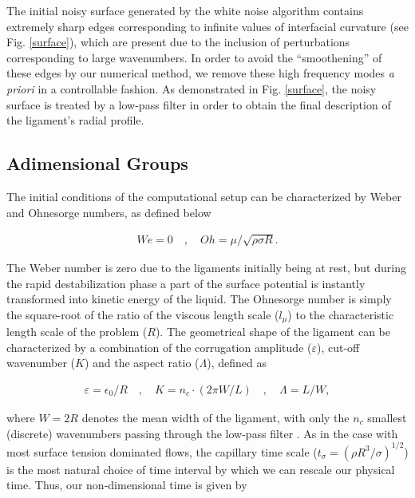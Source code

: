 The initial noisy surface generated by the white noise algorithm
contains extremely sharp edges corresponding to infinite values of 
interfacial curvature (see Fig. \ref{surface}), which are present due
to the inclusion of perturbations corresponding to large wavenumbers. 
In order to avoid the ``smoothening'' of these edges by our numerical method,   
we remove these high frequency modes \textit{a priori} in a controllable fashion. 
As demonstrated in Fig. \ref{surface}, the noisy surface is treated by a low-pass filter 
in order to obtain the final description of the ligament's radial profile. 


\subsection*{Adimensional Groups}

The initial conditions of the computational setup can be 
characterized by Weber and Ohnesorge numbers, as defined below   

\begin{align}
	We = 0 \quad , \quad Oh = \mu / \sqrt{\rho \sigma R} . 
\end{align}

The Weber number is zero due to the ligaments initially being at rest, 
but during the rapid destabilization phase a part of the surface 
potential is instantly transformed into kinetic energy of the liquid.  
The Ohnesorge number is simply the square-root of the ratio  
of the viscous length scale ($l_\mu$)  
to the characteristic length scale of the problem ($R$).
The geometrical shape of the ligament can 
be characterized by a combination of the 
corrugation amplitude ($\varepsilon$),
cut-off wavenumber ($K$) and the aspect ratio ($\Lambda$), defined as   

\begin{align}
 \varepsilon = \epsilon_0 / R \quad , \quad K = n_c \cdot \left(2\pi W/ L \right) \quad
	, \quad \Lambda = L / W , 
\end{align}

where $W = 2R$ denotes the mean width of the ligament, with only
the $n_c$ smallest (discrete) wavenumbers passing through the low-pass filter .
As in the case with most surface tension dominated flows, 
the capillary time scale ($t_\sigma = (\rho R^3 / \sigma)^{1/2}$) is the most 
natural choice of time interval by which we can rescale our physical time.
Thus, our non-dimensional time is given by 


